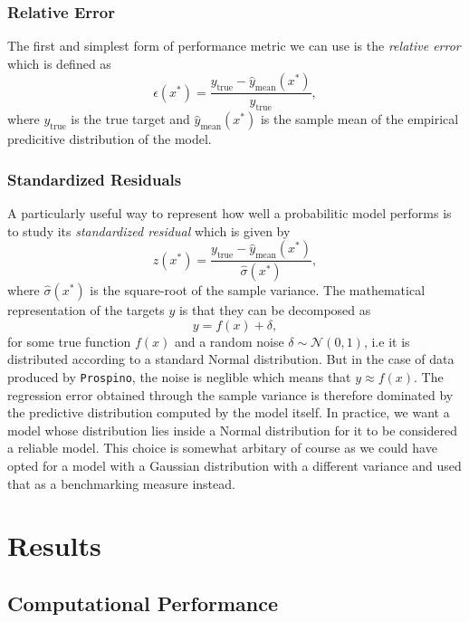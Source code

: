 \subsubsection{Relative Error}
The first and simplest form of performance metric we can use is the \textit{relative error} which is defined as
\begin{equation}
    \epsilon(x^*) = \frac{y_\text{true}- \hat{y}_\text{mean}(x^*)}{y_\text{true}},
\end{equation}
where $y_\text{true}$ is the true target and $\hat{y}_\text{mean}(x^*)$ is the sample mean of the empirical predicitive distribution of the model.

\subsubsection{Standardized Residuals}
A particularly useful way to represent how well a probabilitic model performs is to study its \textit{standardized residual} which is given by
\begin{equation}
    z(x^*) = \frac{y_\text{true} - \hat{y}_\text{mean}(x^*)}{\hat{\sigma}(x^*)},
\end{equation}
where $\hat{\sigma}(x^*)$ is the square-root of the sample variance. The mathematical representation of the targets $y$ is that they can be decomposed as
\begin{equation}
    y = f(x) + \delta,
\end{equation}
for some true function $f(x)$ and a random noise $\delta \sim \mathcal{N}(0, 1)$, i.e it is distributed according to a standard Normal distribution. But in the case of data produced by \texttt{Prospino}, the noise is neglible which means that $y \approx f(x)$. The regression error obtained through the sample variance is therefore dominated by the predictive distribution computed by the model itself. In practice, we want a model whose distribution lies inside a Normal distribution for it to be considered a reliable model. This choice is somewhat arbitary of course as we could have opted for a model with a Gaussian distribution with a different variance and used that as a benchmarking measure instead. 



\section{Results}\label{sec:results}
\subsection{Computational Performance}

